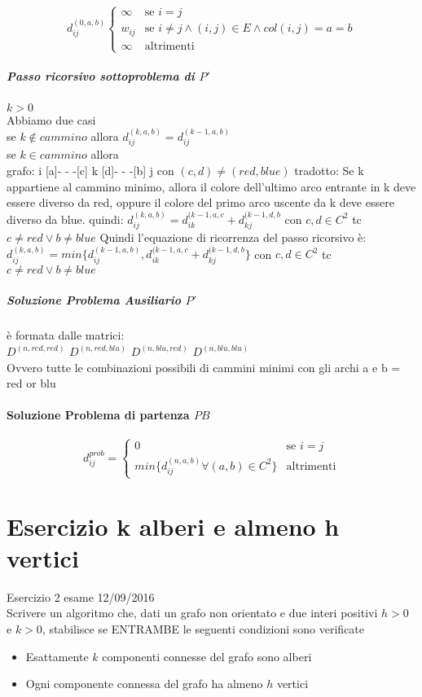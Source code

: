 \documentclass[12pt, a4paper, openany]{book}
\begin{document}
	\begin{equation*}
		d^{(0,a,b)}_{ij} \begin{cases}
			\infty & \text{se $i=j$}                                             \\
			w_{ij} & \text{se $i\neq j \land (i,j)\in E \land col(i,j) = a = b$} \\
			\infty & \text{altrimenti}
		\end{cases}
	\end{equation*}

	\subparagraph{Passo ricorsivo sottoproblema di $P'$} $k > 0$\\
	Abbiamo due casi\\
	se $k \notin cammino$ allora $d^{(k,a,b)}_{ij} = d^{(k-1,a,b)}_{ij}$\\
	se $k \in cammino$ allora \\
	grafo: i [a]- - -[c] k [d]- - -[b] j con $(c,d) \neq (red,blue)$
	tradotto: Se k appartiene al cammino minimo, allora il colore dell'ultimo arco entrante in k deve essere diverso da red, oppure il colore del primo arco uscente da k deve essere diverso da blue.
	quindi: $d^{(k,a,b)}_{ij} = d^{(k-1,a,c}_{ik} + d^{(k-1,d,b}_{kj}$ con $c,d \in C^2$ tc $c\neq red \vee b\neq blue$
	Quindi l'equazione di ricorrenza del passo ricorsivo è:\\
$d^{(k,a,b)}_{ij} = min\{d^{(k-1,a,b)}_{ij} ,d^{(k-1,a,c}_{ik} + d^{(k-1,d,b}_{kj}\}$ con $c,d \in C^2$ tc $c\neq red \vee b\neq blue$

	\subparagraph{Soluzione Problema Ausiliario $P'$} è formata dalle matrici:\\
$D^{(n,red,red)}$ $D^{(n,red,blu)}$ $D^{(n,blu,red)}$ $D^{(n,blu,blu)}$ \\
	Ovvero tutte le combinazioni possibili di cammini minimi con gli archi a e b = red or blu

	\paragraph{Soluzione Problema di partenza $PB$}
	\begin{equation*}
		d^{prob}_{ij} = \begin{cases}
			0                                             & \text{se $i=j$}   \\
			min\{d^{(n,a,b)}_{ij} \forall (a,b) \in C^2\} & \text{altrimenti}
		\end{cases}
	\end{equation*}

	\section{Esercizio k alberi e almeno h vertici} Esercizio 2 esame 12/09/2016\\
	Scrivere un algoritmo che, dati un grafo non orientato e due interi positivi $h>0$ e $k>0$, stabilisce se ENTRAMBE le seguenti condizioni sono verificate
	\begin{itemize}
		\item Esattamente $k$ componenti connesse del grafo sono alberi
		\item Ogni componente connessa del grafo ha almeno $h$ vertici
	\end{itemize}
\end{document}
